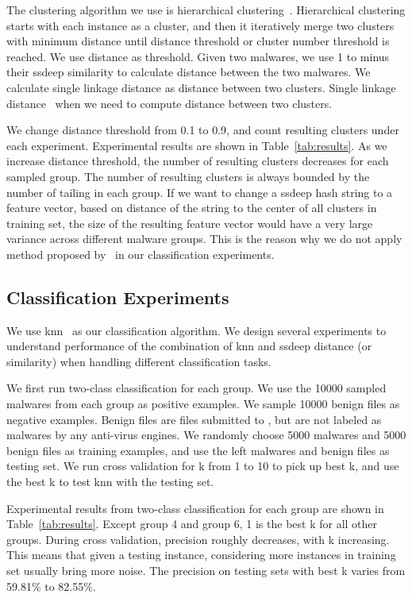 The clustering algorithm we use is hierarchical clustering~\cite{hcluster}.
Hierarchical clustering starts with each instance as a cluster, 
and then it iteratively merge two clusters with minimum distance 
until distance threshold or cluster number threshold is reached. 
We use distance as threshold. 
Given two malwares, 
we use 1 to minus their ssdeep similarity to calculate distance between the two malwares. 
We calculate single linkage distance as distance between two clusters. 
Single linkage
distance~\cite{single-link} when we need to compute distance between two clusters. 

We change distance threshold from 0.1 to 0.9, 
and count resulting clusters under each experiment. 
Experimental results are shown in Table~\ref{tab:results}. 
As we increase distance threshold, the number of resulting clusters decreases for each sampled group. 
The number of resulting clusters is always bounded by the number of tailing in each group. 
If we want to change a ssdeep hash string to a feature vector, 
based on distance of the string to the center of all clusters in training set, 
the size of the resulting feature vector would have a very large variance across different malware groups. 
This is the reason why we do not apply method proposed by~\citet{clustering-purpose} in our classification experiments. 


\subsection{Classification Experiments}

We use knn~\cite{knn} as our classification algorithm.
We design several experiments to understand performance of 
the combination of knn and ssdeep distance (or similarity) when handling different classification tasks. 

We first run two-class classification for each group. 
We use the 10000 sampled malwares from each group as positive examples. 
We sample 10000 benign files as negative examples. 
Benign files are files submitted to \vt{}, but are not labeled as malwares by any anti-virus engines. 
We randomly choose 5000 malwares and 5000 benign files as training examples, 
and use the left malwares and benign files as testing set. 
We run cross validation for k from 1 to 10 to pick up best k, 
and use the best k to test knn with the testing set. 

Experimental results from two-class 
classification for each group are shown in Table~\ref{tab:results}.
Except group 4 and group 6, 1 is the best k for all other groups. 
During cross validation, precision roughly decreases, with k increasing. 
This means that given a testing instance, 
considering more instances in training set usually bring more noise. 
The precision on testing sets with best k varies from 59.81\% to 82.55\%.

